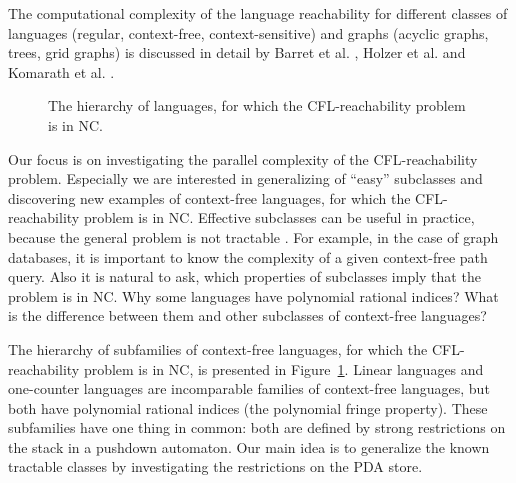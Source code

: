 \documentclass{ws-ijfcs}
\begin{document}
The computational complexity of the language reachability for different classes of languages (regular, context-free, context-sensitive) and graphs (acyclic graphs, trees, grid graphs) is discussed in detail by Barret et al. \cite{Barrett}, Holzer et al.\cite{labelledGraphs} and Komarath et al. \cite{LReach}. 


\begin{figure}
\centering
{}
\caption{The hierarchy of languages, for which the CFL-reachability problem is in NC.}
\label{hierarchy}      
\end{figure}
Our focus is on investigating the parallel complexity of the CFL-reachability problem. Especially we are interested in generalizing of ``easy'' subclasses and discovering new examples of context-free languages, for which the CFL-reachability problem is in NC. Effective subclasses can be useful in practice, because the general problem is not tractable \cite{ExperimentalCFPQ}. For example, in the case of graph databases, it is important to know the complexity of a given context-free path query. Also it is natural to ask, which properties of subclasses imply that the problem is in NC. Why some languages have polynomial rational indices? What is the difference between them and other subclasses of context-free languages?


The hierarchy of subfamilies of context-free languages, for which the CFL-reachability problem is in NC, is presented in Figure~\ref{hierarchy}. Linear languages and one-counter languages are incomparable families of context-free languages, but both have polynomial rational indices (the polynomial fringe property). These subfamilies have one thing in common: both are defined by strong restrictions on the stack in a pushdown automaton. Our main idea is to generalize the known tractable classes by investigating the restrictions on the PDA store.
\end{document}
